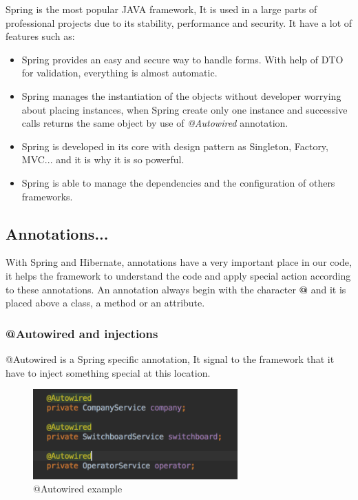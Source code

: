 Spring is the most popular JAVA framework, It is used in a large parts of professional projects due to its stability, performance and security.
It have a lot of features such as:

\begin{itemize}  
\item Spring provides an easy and secure way to handle forms. With help of DTO for validation, everything is almost automatic.

\item Spring manages the instantiation of the objects without developer worrying about placing instances, when Spring create only one instance and successive calls returns the same object by use of \textit{@Autowired} annotation.

\item Spring is developed in its core with design pattern as Singleton, Factory, MVC... and it is why it is so powerful.
\item Spring is able to manage the dependencies and the configuration of others frameworks.
\end{itemize}  



\subsection{Annotations...}

With Spring and Hibernate, annotations have a very important place in our code, it helps the framework to understand the code and apply special action according to these annotations.
An annotation always begin with the character \textbf{@} and it is placed above a class, a method or an attribute.

\subsubsection{@Autowired and injections}
@Autowired is a Spring specific annotation, It signal to the framework that it have to inject something special at this location.

\begin{figure}[H]
  \caption{@Autowired example}
  \centering
    \includegraphics[width=0.7\textwidth]{img/autowired.png}
\end{figure}

